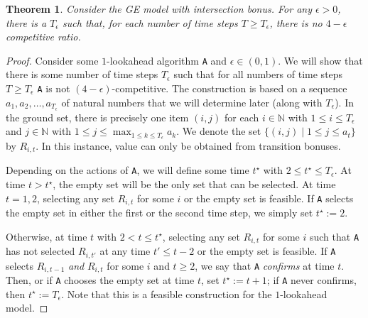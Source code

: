\documentclass[a4paper]{book}
\newtheorem{theorem}{Theorem}[chapter]
\newtheorem{proof}{\noindent{\bf Proof.} }
\begin{document}
\begin{theorem}\label{thm:general-intersection-lower1}
Consider the GE model with intersection bonus. For any $\epsilon >0$, there is a $T_\epsilon$ such that, for each number of time steps $T\geq T_\epsilon$, there is no $4-\epsilon$ competitive ratio.
\end{theorem}
\begin{proof}
Consider some $1$-lookahead algorithm \texttt{A} and $\epsilon\in(0,1)$. We will show that there is some number of time steps $T_\epsilon$ such that for all numbers of time steps $T\geq T_\epsilon$ \texttt{A} is not $(4-\epsilon)$-competitive. The construction is based on a sequence $a_1,a_2,\dots,a_{T_\epsilon}$ of natural numbers that we will determine later (along with $T_\epsilon$). In the ground set, there is precisely one item $(i,j)$ for each $i\in\mathbb{N}$ with $1\leq i\leq T_\epsilon$ and $j\in\mathbb{N}$ with $1\leq j\leq\max_{1\leq k\leq T_\epsilon}a_k$. We denote the set $\{(i,j)\mid 1\leq j\leq a_t\}$ by $R_{i,t}$. In this instance, value can only be obtained from transition bonuses.

Depending on the actions of \texttt{A}, we will define some time $t^\star$ with $2\leq t^\star\leq T_\epsilon$. At time $t>t^\star$, the empty set will be the only set that can be selected. At time $t=1,2$, selecting any set $R_{i,t}$ for some $i$ or the empty set is feasible. If \texttt{A} selects the empty set in either the first or the second time step, we simply set $t^\star:=2$.

Otherwise, at time $t$ with $2<t\leq t^\star$, selecting any set $R_{i,t}$ for some $i$ such that \texttt{A} has not selected $R_{i,t'}$ at any time $t'\leq t-2$ or the empty set is feasible. If \texttt{A} selects $R_{i,t-1}$ \emph{and} $R_{i,t}$ for some $i$ and $t\geq 2$, we say that \texttt{A} \emph{confirms} at time $t$. Then, or if \texttt{A} chooses the empty set at time $t$, set $t^\star:=t+1$; if \texttt{A} never confirms, then $t^\star:=T_\epsilon$. Note that this is a feasible construction for the $1$-lookahead model. 


\end{proof}
\end{document}
